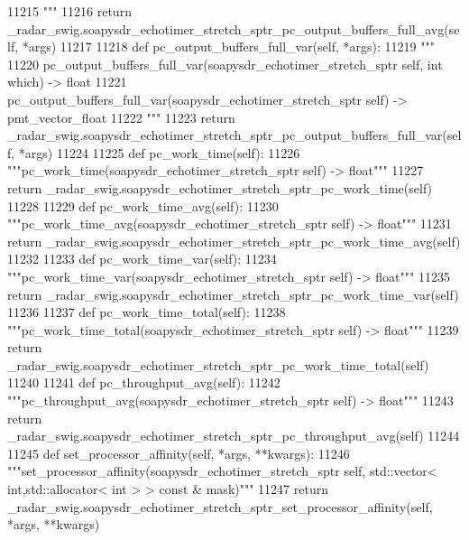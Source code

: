 \begin{DoxyCode}
{{{{{{{{{{{{{{{{{{{{{{{{{{{{{{{{{{{11215 \textcolor{stringliteral}{        """}
11216         \textcolor{keywordflow}{return} \_radar\_swig.soapysdr\_echotimer\_stretch\_sptr\_pc\_output\_buffers\_full\_avg(self, *args)
11217 
11218     \textcolor{keyword}{def }pc_output_buffers_full_var(self, *args):
11219         \textcolor{stringliteral}{"""}
11220 \textcolor{stringliteral}{        pc\_output\_buffers\_full\_var(soapysdr\_echotimer\_stretch\_sptr self, int which) -> float}
11221 \textcolor{stringliteral}{        pc\_output\_buffers\_full\_var(soapysdr\_echotimer\_stretch\_sptr self) -> pmt\_vector\_float}
11222 \textcolor{stringliteral}{        """}
11223         \textcolor{keywordflow}{return} \_radar\_swig.soapysdr\_echotimer\_stretch\_sptr\_pc\_output\_buffers\_full\_var(self, *args)
11224 
11225     \textcolor{keyword}{def }pc_work_time(self):
11226         \textcolor{stringliteral}{"""pc\_work\_time(soapysdr\_echotimer\_stretch\_sptr self) -> float"""}
11227         \textcolor{keywordflow}{return} \_radar\_swig.soapysdr\_echotimer\_stretch\_sptr\_pc\_work\_time(self)
11228 
11229     \textcolor{keyword}{def }pc_work_time_avg(self):
11230         \textcolor{stringliteral}{"""pc\_work\_time\_avg(soapysdr\_echotimer\_stretch\_sptr self) -> float"""}
11231         \textcolor{keywordflow}{return} \_radar\_swig.soapysdr\_echotimer\_stretch\_sptr\_pc\_work\_time\_avg(self)
11232 
11233     \textcolor{keyword}{def }pc_work_time_var(self):
11234         \textcolor{stringliteral}{"""pc\_work\_time\_var(soapysdr\_echotimer\_stretch\_sptr self) -> float"""}
11235         \textcolor{keywordflow}{return} \_radar\_swig.soapysdr\_echotimer\_stretch\_sptr\_pc\_work\_time\_var(self)
11236 
11237     \textcolor{keyword}{def }pc_work_time_total(self):
11238         \textcolor{stringliteral}{"""pc\_work\_time\_total(soapysdr\_echotimer\_stretch\_sptr self) -> float"""}
11239         \textcolor{keywordflow}{return} \_radar\_swig.soapysdr\_echotimer\_stretch\_sptr\_pc\_work\_time\_total(self)
11240 
11241     \textcolor{keyword}{def }pc_throughput_avg(self):
11242         \textcolor{stringliteral}{"""pc\_throughput\_avg(soapysdr\_echotimer\_stretch\_sptr self) -> float"""}
11243         \textcolor{keywordflow}{return} \_radar\_swig.soapysdr\_echotimer\_stretch\_sptr\_pc\_throughput\_avg(self)
11244 
11245     \textcolor{keyword}{def }set_processor_affinity(self, *args, **kwargs):
11246         \textcolor{stringliteral}{"""set\_processor\_affinity(soapysdr\_echotimer\_stretch\_sptr self, std::vector< int,std::allocator<
       int > > const & mask)"""}
11247         \textcolor{keywordflow}{return} \_radar\_swig.soapysdr\_echotimer\_stretch\_sptr\_set\_processor\_affinity(self, *args, **kwargs)
}}}}}}}}}}}}}}}}}}}}}}}}}}}}}}}}}}}
\end{DoxyCode}
